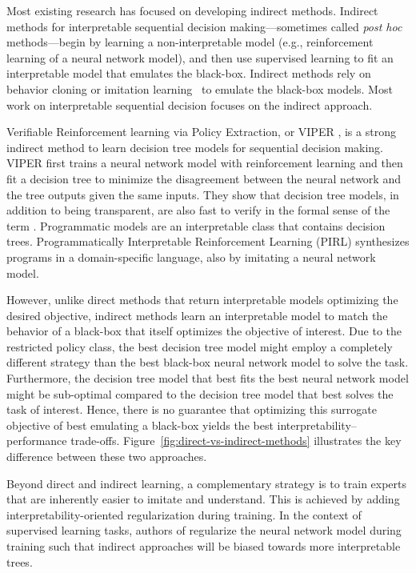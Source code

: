 Most existing research has focused on developing indirect methods. 
Indirect methods for interpretable sequential decision making—sometimes called \textit{post hoc} methods—begin by learning a non-interpretable model (e.g., reinforcement learning of a neural network model), and then use supervised learning to fit an interpretable model that emulates the black-box.
Indirect methods rely on behavior cloning or imitation learning~\cite{behavior-cloning,dagger} to emulate the black-box models.
Most work on interpretable sequential decision focuses on the indirect approach\cite{viper,PIRL}.

Verifiable Reinforcement learning via Policy Extraction, or VIPER \cite{viper}, is a strong indirect method to learn decision tree models for sequential decision making. VIPER first trains a neural network model with reinforcement learning and then fit a decision tree to minimize the disagreement between the neural network and the tree outputs given the same inputs.
They show that decision tree models, in addition to being transparent, are also fast to verify in the formal sense of the term \cite{maraboupy}.
Programmatic models are an interpretable class that contains decision trees. 
Programmatically Interpretable Reinforcement Learning (PIRL) \cite{PIRL} synthesizes programs in a domain-specific language, also by imitating a neural network model. 

However, unlike direct methods that return interpretable models optimizing the desired objective, indirect methods learn an interpretable model to match the behavior of a black-box that itself optimizes the objective of interest. 
Due to the restricted policy class, the best decision tree model might employ a completely different strategy than the best black-box neural network model to solve the task.
Furthermore, the decision tree model that best fits the best neural network model might be sub-optimal compared to the decision tree model that best solves the task of interest.
Hence, there is no guarantee that optimizing this surrogate objective of best emulating a black-box yields the best interpretability–performance trade-offs. 
Figure~\ref{fig:direct-vs-indirect-methods} illustrates the key difference between these two approaches. 

Beyond direct and indirect learning, a complementary strategy is to train experts that are inherently easier to imitate and understand.
This is achieved by adding interpretability-oriented regularization during training. In the context of supervised learning tasks, authors of \cite{parbhoo} regularize the neural network model during training such that indirect approaches will be biased towards more interpretable trees.

